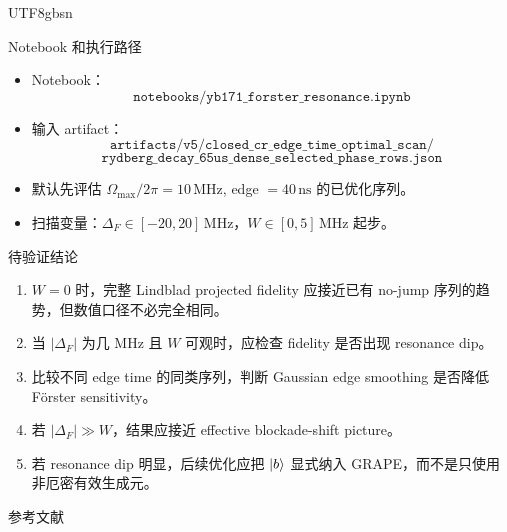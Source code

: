 \documentclass[aspectratio=169,11pt]{beamer}
\newcommand{\ketb}{\ket{b}}
\newcommand{\Dforster}{\Delta_F}
\begin{document}
\begin{CJK*}{UTF8}{gbsn}
\begin{frame}{Notebook 和执行路径}
  \begin{itemize}
    \item Notebook：
      \[
        \texttt{notebooks/yb171\_forster\_resonance.ipynb}
      \]
    \item 输入 artifact：
      \[
        \texttt{artifacts/v5/closed\_cr\_edge\_time\_optimal\_scan/}
      \]
      \[
        \texttt{rydberg\_decay\_65us\_dense\_selected\_phase\_rows.json}
      \]
    \item 默认先评估 \(\Omega_{\max}/2\pi=10\,\mathrm{MHz}\), edge \(=40\,\mathrm{ns}\) 的已优化序列。
    \item 扫描变量：\(\Dforster\in[-20,20]\,\mathrm{MHz}\)，\(W\in[0,5]\,\mathrm{MHz}\) 起步。
  \end{itemize}
\end{frame}

\begin{frame}{待验证结论}
  \begin{enumerate}
    \item \(W=0\) 时，完整 Lindblad projected fidelity 应接近已有 no-jump 序列的趋势，但数值口径不必完全相同。
    \item 当 \(|\Dforster|\) 为几 MHz 且 \(W\) 可观时，应检查 fidelity 是否出现 resonance dip。
    \item 比较不同 edge time 的同类序列，判断 Gaussian edge smoothing 是否降低 Förster sensitivity。
    \item 若 \(|\Dforster|\gg W\)，结果应接近 effective blockade-shift picture。
    \item 若 resonance dip 明显，后续优化应把 \(\ketb\) 显式纳入 GRAPE，而不是只使用非厄密有效生成元。
  \end{enumerate}
\end{frame}

\begin{frame}{参考文献}
  \printbibliography
\end{frame}

\end{CJK*}
\end{document}
